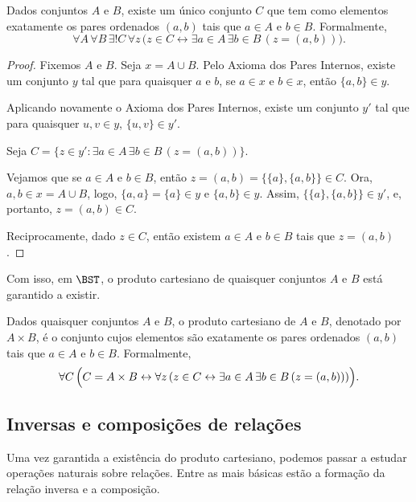 \begin{proposition}[$\BST$]\label{prop:existenciaDoProdutoCartesianoComParesInternos}
    Dados conjuntos $A$ e $B$, existe um único conjunto $C$ que tem como elementos exatamente os pares ordenados $(a, b)$ tais que $a \in A$ e $b \in B$.
    Formalmente,
    \[
        \forall A\, \forall B\, \exists! C\, \forall z\,\bigl(z \in C \leftrightarrow \exists a\in A\, \exists b\in B\,(z = (a, b))\bigr).
    \]
\end{proposition}
\begin{proof}
    Fixemos $A$ e $B$.
    Seja $x=A\cup B$.
    Pelo Axioma dos Pares Internos, existe um conjunto $y$ tal que para quaisquer $a$ e $b$, se $a \in x$ e $b \in x$, então $\{a, b\} \in y$.
    
    Aplicando novamente o Axioma dos Pares Internos, existe um conjunto $y'$ tal que para quaisquer $u, v \in y$, $\{u, v\} \in y'$.
    
    Seja $C = \{z \in y' : \exists a\in A\, \exists b\in B\,(z = (a, b))\}$.
    
    Vejamos que se $a \in A$ e $b \in B$, então $z = (a, b) = \{\{a\}, \{a, b\}\} \in C$.
    Ora, $a, b \in x=A\cup B$, logo, $\{a, a\}=\{a\} \in y$ e $\{a, b\} \in y$.
    Assim, $\{\{a\}, \{a, b\}\} \in y'$, e, portanto, $z = (a, b) \in C$.

    Reciprocamente, dado $z \in C$, então existem $a \in A$ e $b \in B$ tais que $z = (a, b)$.
\end{proof}

Com isso, em $\BST$, o produto cartesiano de quaisquer conjuntos $A$ e $B$ está garantido a existir.

\begin{definition}[$\BST$]\label{def:produtoCartesiano}
    Dados quaisquer conjuntos $A$ e $B$, o produto cartesiano de $A$ e $B$, denotado por $A \times B$, é o conjunto cujos elementos são exatamente os pares ordenados $(a, b)$ tais que $a \in A$ e $b \in B$.
    Formalmente,
    \[
        \forall C\, \Bigl(C = A \times B \leftrightarrow \forall z\, (z \in C \leftrightarrow \exists a \in A\, \exists b \in B\, (z = (a, b)))\Bigr).
    \]
\end{definition}

\subsection{Inversas e composições de relações}\label{subsec:inversasEComposicoesDeRelacoes}
Uma vez garantida a existência do produto cartesiano, podemos passar a estudar operações naturais sobre relações.
Entre as mais básicas estão a formação da relação inversa e a composição.


